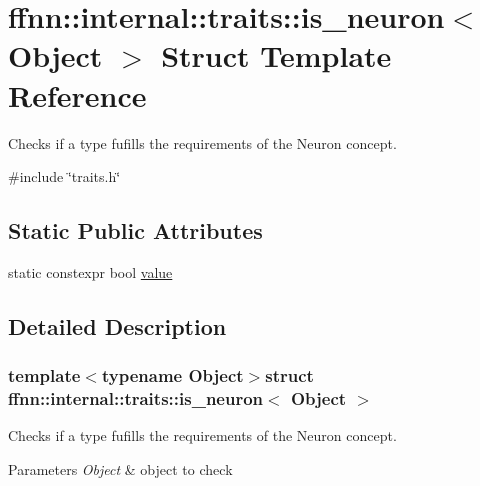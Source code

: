 \hypertarget{structffnn_1_1internal_1_1traits_1_1is__neuron}{\section{ffnn\-:\-:internal\-:\-:traits\-:\-:is\-\_\-neuron$<$ Object $>$ Struct Template Reference}
\label{structffnn_1_1internal_1_1traits_1_1is__neuron}
}


Checks if a type fufills the requirements of the Neuron concept.  




{\ttfamily \#include \char`\"{}traits.\-h\char`\"{}}

\subsection*{Static Public Attributes}
\begin{DoxyCompactItemize}
\item 
static constexpr bool \hyperlink{structffnn_1_1internal_1_1traits_1_1is__neuron_a672d6bd8da5e49790bfa7ce7f6bf795e}{value}
\end{DoxyCompactItemize}


\subsection{Detailed Description}
\subsubsection*{template$<$typename Object$>$struct ffnn\-::internal\-::traits\-::is\-\_\-neuron$<$ Object $>$}

Checks if a type fufills the requirements of the Neuron concept. 


\begin{DoxyParams}{Parameters}
{\em Object} & object to check \\
\hline
\end{DoxyParams}



